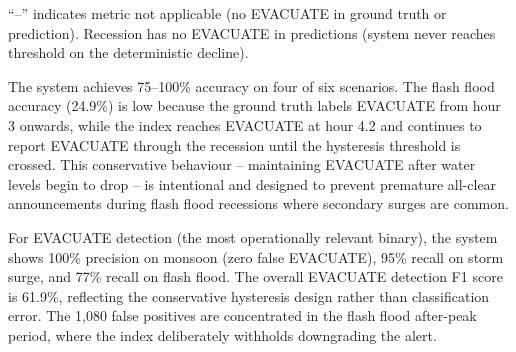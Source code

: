 \documentclass[5p,twocolumn]{elsarticle}
\begin{document}
\begin{table}[htbp]
  \caption{Classification metrics per scenario. Accuracy is three-tier agreement. Precision, recall, and F1 are reported for EVACUATE detection. Lead times are from the deterministic trace.}
  \label{tab:metrics}
  \centering
  \footnotesize
  \setlength{\tabcolsep}{2pt}
  \vspace{4pt}
  \footnotesize ``--'' indicates metric not applicable (no EVACUATE in ground truth or prediction). Recession has no EVACUATE in predictions (system never reaches threshold on the deterministic decline).
\end{table}

The system achieves 75--100\% accuracy on four of six scenarios. The flash flood accuracy (24.9\%) is low because the ground truth labels EVACUATE from hour 3 onwards, while the index reaches EVACUATE at hour 4.2 and continues to report EVACUATE through the recession until the hysteresis threshold is crossed. This conservative behaviour -- maintaining EVACUATE after water levels begin to drop -- is intentional and designed to prevent premature all-clear announcements during flash flood recessions where secondary surges are common.

For EVACUATE detection (the most operationally relevant binary), the system shows 100\% precision on monsoon (zero false EVACUATE), 95\% recall on storm surge, and 77\% recall on flash flood. The overall EVACUATE detection F1 score is 61.9\%, reflecting the conservative hysteresis design rather than classification error. The 1,080 false positives are concentrated in the flash flood after-peak period, where the index deliberately withholds downgrading the alert.
\end{document}
